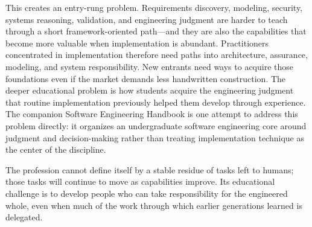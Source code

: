 This creates an entry-rung problem. Requirements discovery, modeling, security, systems reasoning, validation, and engineering judgment are harder to teach through a short framework-oriented path---and they are also the capabilities that become more valuable when implementation is abundant. Practitioners concentrated in implementation therefore need paths into architecture, assurance, modeling, and system responsibility. New entrants need ways to acquire those foundations even if the market demands less handwritten construction. The deeper educational problem is how students acquire the engineering judgment that routine implementation previously helped them develop through experience. The companion Software Engineering Handbook is one attempt to address this problem directly: it organizes an undergraduate software engineering core around judgment and decision-making rather than treating implementation technique as the center of the discipline\citep{davis2026sehandbook}.


The profession cannot define itself by a stable residue of tasks left to humans; those tasks will continue to move as capabilities improve. Its educational challenge is to develop people who can take responsibility for the engineered whole, even when much of the work through which earlier generations learned is delegated.